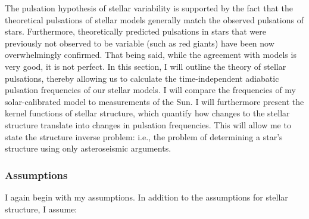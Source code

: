 The pulsation hypothesis of stellar variability is supported by the fact that the theoretical pulsations of stellar models generally match the observed pulsations of stars. 
Furthermore, theoretically predicted pulsations in stars that were previously not observed to be variable (such as red giants) have been now overwhelmingly confirmed. 
That being said, while the agreement with models is very good, it is not perfect. 
In this section, I will outline the theory of stellar pulsations, thereby allowing us to calculate the time-independent adiabatic pulsation frequencies of our stellar models. 
I will compare the frequencies of my solar-calibrated model to measurements of the Sun. 
I will furthermore present the kernel functions of stellar structure, which quantify how changes to the stellar structure translate into changes in pulsation frequencies. 
This will allow me to state the structure inverse problem: i.e., the problem of determining a star's structure using only asteroseismic arguments. 



\subsubsection*{Assumptions} 

I again begin with my assumptions. In addition to the assumptions for stellar structure, I assume: 


